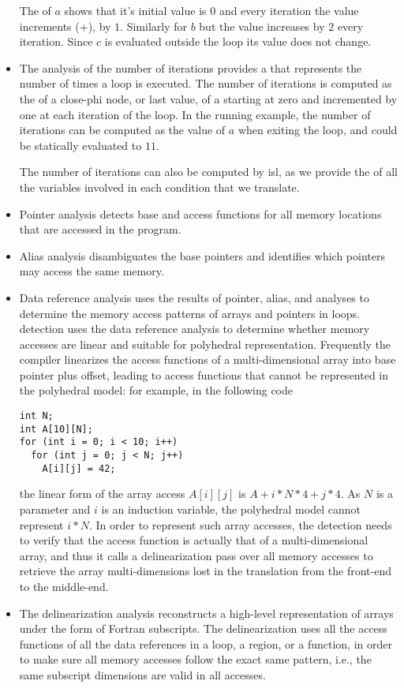 \documentclass{sig-alternate}
\begin{document}
\begin{itemize}
  The \scev{} of $a$ shows that it's initial value is $0$ and every iteration
  the value increments ($+$), by $1$. Similarly for $b$ but the value increases
  by $2$ every iteration.  Since $c$ is evaluated outside the loop its value
  does not change.

\item The analysis of the number of iterations \cite{scev} provides a \scev{}
  that represents the number of times a loop is executed.  The number of
  iterations is computed as the \scev{} of a close-phi node, or last value, of a
  \scev{} starting at zero and incremented by one at each iteration of the loop.
  In the running example, the number of iterations can be computed as the value
  of $a$ when exiting the loop, and could be statically evaluated to $11$.

  The number of iterations can also be computed by isl, as we provide the
   of all the variables involved in each condition that we translate.

\item Pointer analysis detects base and access functions for all memory
  locations that are accessed in the program.

\item Alias analysis disambiguates the base pointers and identifies which
  pointers may access the same memory.

\item Data reference analysis uses the results of pointer, alias, and \scev{}
  analyses to determine the memory access patterns of arrays and pointers in
  loops.  \SCoP{} detection uses the data reference analysis to determine
  whether memory accesses are linear and suitable for polyhedral representation.
  Frequently the compiler linearizes the access functions of a multi-dimensional
  array into base pointer plus offset, leading to access functions that cannot
  be represented in the polyhedral model: for example, in the following code
  \begin{verbatim}
int N;
int A[10][N];
for (int i = 0; i < 10; i++)
  for (int j = 0; j < N; j++)
    A[i][j] = 42;
  \end{verbatim}
  the linear form of the array access $A[i][j]$ is $A + i * N * 4 + j * 4$.  As
  $N$ is a parameter and $i$ is an induction variable, the polyhedral model
  cannot represent $i*N$.  In order to represent such array accesses, the
  \SCoP{} detection needs to verify that the access function is actually that of
  a multi-dimensional array, and thus it calls a delinearization pass over all
  memory accesses to retrieve the array multi-dimensions lost in the translation
  from the front-end to the middle-end.

\item The delinearization analysis \cite{delinearization1, delinearization2}
  reconstructs a high-level representation of arrays under the form of Fortran
  subscripts.  The delinearization uses all the access functions of all the data
  references in a loop, a region, or a function, in order to make sure all
  memory accesses follow the exact same pattern, i.e., the same subscript
  dimensions are valid in all accesses.
\end{itemize}
\end{document}
